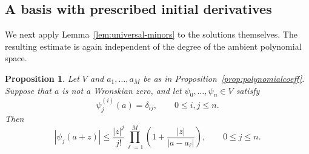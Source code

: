 \documentclass[12pt,letterpaper,reqno]{amsart}
\newtheorem{prop}[thm]{Proposition}
\theoremstyle{definition}
\numberwithin{equation}{section}
\begin{document}
\subsection{A basis with prescribed initial derivatives}
\label{sec:initial-basis}

We next apply Lemma~\ref{lem:universal-minors} to the solutions
themselves. The resulting estimate is again independent of the degree
of the ambient polynomial space.

\begin{prop}\label{prop:initial-basis}
Let \(V\) and \(a_1,\ldots,a_M\) be as in
Proposition~\ref{prop:polynomialcoeff}. Suppose that \(a\) is not a
Wronskian zero, and let
\(\psi_0,\ldots,\psi_{n}\in V\) satisfy
\begin{equation}\label{eq:initial-normalization}
 \psi_j^{(i)}(a)=\delta_{ij},
 \qquad
 0\leq i,j\leq n.
\end{equation}
Then
\begin{equation}\label{eq:basismajorant}
 |\psi_j(a+z)|
 \leq
 \frac{|z|^j}{j!}
 \prod_{\ell=1}^M
 \left(
 1+\frac{|z|}{|a-a_\ell|}
 \right),
 \qquad
 0\leq j\leq n.
\end{equation}
\end{prop}
\end{document}
